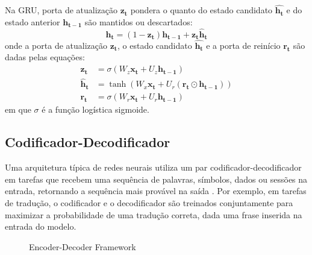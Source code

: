 Na GRU, porta de atualização $\mathbf{z_t}$ pondera o quanto do
estado candidato $\mathbf{\hat{h_t}}$ e do estado anterior $\mathbf{h_{t-1}}$
são mantidos ou descartados:
\begin{equation}
    \mathbf{h_t} = (1 - \mathbf{z_t})\mathbf{h_{t-1}} + \mathbf{z_t}\mathbf{\hat{h}_t}
\end{equation}
onde a porta de atualização $\mathbf{z_t}$, o estado candidato $\mathbf{\hat{h_t}}$
e a porta de reinício $\mathbf{r_t}$ são dadas pelas equações:
\begin{align}
    \mathbf{z_t} &= \sigma(W_z\mathbf{x_t} + U_z\mathbf{h_{t-1}}) \\
    \mathbf{\hat{h}_t} &= \tanh(W_x\mathbf{x_t} + U_r(\mathbf{r_t} \odot \mathbf{h_{t-1}})) \\
    \mathbf{r_t} &= \sigma(W_r\mathbf{x_t} + U_r\mathbf{h_{t-1}})
\end{align}
em que $\sigma$ é a função logística sigmoide.

\subsection{Codificador-Decodificador}
Uma arquitetura típica de redes neurais utiliza um par codificador-decodificador
em tarefas que recebem uma sequência de palavras, símbolos, dados ou sessões na
entrada, retornando a sequência mais provável na saída
\cite{bahdanau2016neural}. Por exemplo, em tarefas de tradução, o codificador e
o decodificador são treinados conjuntamente para maximizar a probabilidade de
uma tradução correta, dada uma frase inserida na entrada do modelo.

\vspace{1cm}
\begin{figure}[htbp]
    \centering
      \caption{Encoder-Decoder Framework}

\end{figure}

